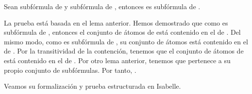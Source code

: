 \begin{isabellebody}
\begin{isamarkuptext}
  \begin{lema}
    Sean  subfórmula de  y  subfórmula de , entonces 
     es subfórmula de .
  \end{lema}

  \begin{demostracion}
  La prueba está basada en el lema anterior. Hemos demostrado que como 
   es subfórmula de , entonces el conjunto de átomos de  está
  contenido en el de . Del mismo modo, como  es subfórmula de
  , su conjunto de átomos está contenido en el de . Por la
  transitividad de la contención, tenemos que el conjunto de átomos de 
   está contenido en el de . Por otro lema anterior, tenemos que
   pertenece a su propio conjunto de subfórmulas. Por tanto,
  .
  \end{demostracion}

  Veamos su formalización y prueba estructurada en Isabelle.


\end{isamarkuptext}
\end{isabellebody}
